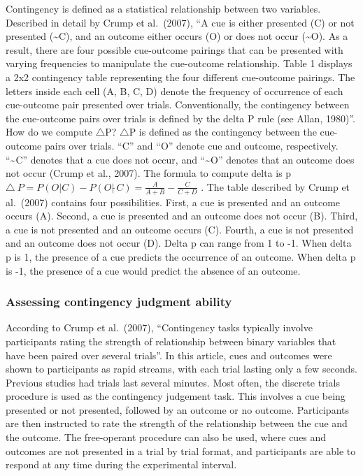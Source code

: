 \documentclass[
  english,
  man,floatsintext]{apa6}
\begin{document}
Contingency is defined as a statistical relationship between two variables. Described in detail by Crump et al.~(2007), \enquote{A cue is either presented (C) or not presented (\textasciitilde C), and an outcome either occurs (O) or does not occur (\textasciitilde O). As a result, there are four possible cue-outcome pairings that can be presented with varying frequencies to manipulate the cue-outcome relationship. Table 1 displays a 2x2 contingency table representing the four different cue-outcome pairings. The letters inside each cell (A, B, C, D) denote the frequency of occurrence of each cue-outcome pair presented over trials. Conventionally, the contingency between the cue-outcome pairs over trials is defined by the delta P rule (see Allan, 1980)}. How do we compute \(\triangle\)P? \(\triangle\)P is defined as the contingency between the cue-outcome pairs over trials. \enquote{C} and \enquote{O} denote cue and outcome, respectively. \enquote{\textasciitilde C} denotes that a cue does not occur, and \enquote{\textasciitilde O} denotes that an outcome does not occur (Crump et al., 2007). The formula to compute delta is p \(\triangle\ P = P(O|C) - P(O| \tilde\ C) = \frac{A}{A+B} - \frac{C}{C+D}\) . The table described by Crump et al.~(2007) contains four possibilities. First, a cue is presented and an outcome occurs (A). Second, a cue is presented and an outcome does not occur (B). Third, a cue is not presented and an outcome occurs (C). Fourth, a cue is not presented and an outcome does not occur (D). Delta p can range from 1 to -1. When delta p is 1, the presence of a cue predicts the occurrence of an outcome. When delta p is -1, the presence of a cue would predict the absence of an outcome.

\hypertarget{assessing-contingency-judgment-ability}{%
\subsubsection{Assessing contingency judgment ability}\label{assessing-contingency-judgment-ability}}

According to Crump et al.~(2007), \enquote{Contingency tasks typically involve participants rating the strength of relationship between binary variables that have been paired over several trials}. In this article, cues and outcomes were shown to participants as rapid streams, with each trial lasting only a few seconds. Previous studies had trials last several minutes. Most often, the discrete trials procedure is used as the contingency judgement task. This involves a cue being presented or not presented, followed by an outcome or no outcome. Participants are then instructed to rate the strength of the relationship between the cue and the outcome. The free-operant procedure can also be used, where cues and outcomes are not presented in a trial by trial format, and participants are able to respond at any time during the experimental interval.
\end{document}

